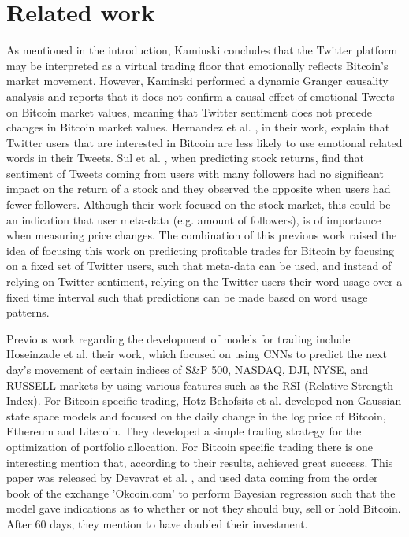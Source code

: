\documentclass[sigconf]{acmart-txmm}
\begin{document}
\section{Related work}
\label{sec:related}
As mentioned in the introduction, Kaminski \cite{1406.7577} concludes that the Twitter platform may be interpreted as a virtual trading floor that emotionally reflects Bitcoin's market movement. However, Kaminski performed a dynamic Granger causality analysis and reports that it does not confirm a causal effect of emotional Tweets on Bitcoin market values, meaning that Twitter sentiment does not precede changes in Bitcoin market values. Hernandez et al. \cite{inproceedings}, in their work, explain that Twitter users that are interested in Bitcoin are less likely to use emotional related words in their Tweets. Sul et al. \cite{sul2017trading}, when predicting stock returns, find that sentiment of Tweets coming from users with many followers had no significant impact on the return of a stock and they observed the opposite when users had fewer followers. Although their work focused on the stock market, this could be an indication that user meta-data (e.g. amount of followers), is of importance when measuring price changes. The combination of this previous work raised the idea of focusing this work on predicting profitable trades for Bitcoin by focusing on a fixed set of Twitter users, such that meta-data can be used, and instead of relying on Twitter sentiment, relying on the Twitter users their word-usage over a fixed time interval such that predictions can be made based on word usage patterns.

Previous work regarding the development of models for trading include Hoseinzade et al. \cite{1810.08923} their work, which focused on using CNNs to predict the next day's movement of certain indices of S&P 500, NASDAQ, DJI, NYSE, and RUSSELL markets by using various features such as the RSI (Relative Strength Index). 
For Bitcoin specific trading, Hotz-Behofsits et al. \cite{1801.06373} developed non-Gaussian state space models and focused on the daily change in the log price of Bitcoin, Ethereum and Litecoin. They developed a simple trading strategy for the optimization of portfolio allocation. For Bitcoin specific trading there is one interesting mention that, according to their results, achieved great success. This paper was released by Devavrat et al. \cite{1410.1231}, and used data coming from the order book of the exchange 'Okcoin.com' to perform Bayesian regression such that the model gave indications as to whether or not they should buy, sell or hold Bitcoin. After 60 days, they mention to have doubled their investment. 
\end{document}

